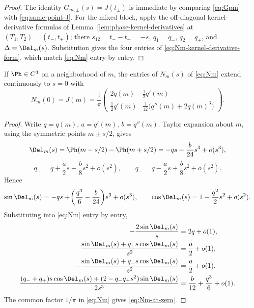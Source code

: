 \begin{proof}
The identity \(G_{m,\pm}(s) = J(t_\pm)\) is immediate by comparing
\eqref{eq:Gpm} with \eqref{eq:same-point-J}.  For the mixed block,
apply the off-diagonal kernel-derivative formulas of
Lemma~\ref{lem:phase-kernel-derivatives} at
\((T_1, T_2) = (t_-, t_+)\); there \(s_{12} = t_- - t_+ = -s\),
\(q_1 = q_-\), \(q_2 = q_+\), and \(\Delta = \Del_m(s)\).
Substitution gives the four entries of
\eqref{eq:Nm-kernel-derivative-form}, which match \eqref{eq:Nm} entry
by entry.
\end{proof}

\begin{lemma}
\label{lem:Nm-removable-singularity}
If \(\Ph\in C^3\) on a neighborhood of \(m\), the entries of
\(N_m(s)\) of \eqref{eq:Nm} extend continuously to \(s=0\) with
\begin{equation}
\label{eq:Nm-at-zero}
        N_m(0) = J(m)
        = \frac1\pi
        \begin{pmatrix}
        2q(m) & \tfrac12 q'(m)\\[0.8ex]
        \tfrac12 q'(m) & \tfrac1{12}\bigl(q''(m)+2q(m)^3\bigr)
        \end{pmatrix}.
\end{equation}
\end{lemma}

\begin{proof}
Write \(q = q(m)\), \(a = q'(m)\), \(b = q''(m)\).  Taylor expansion
about \(m\), using the symmetric points \(m\pm s/2\), gives
\[
        \Del_m(s)
        = \Ph(m-s/2)-\Ph(m+s/2)
        = -qs - \frac{b}{24}s^3 + o(s^3),
\]
\[
        q_+ = q + \frac{a}{2}s + \frac{b}{8}s^2 + o(s^2),
        \qquad
        q_- = q - \frac{a}{2}s + \frac{b}{8}s^2 + o(s^2).
\]
Hence
\[
        \sin\Del_m(s)
        = -qs + \!\left(\frac{q^3}{6}-\frac{b}{24}\right)\!s^3
          + o(s^3),
        \qquad
        \cos\Del_m(s) = 1 - \frac{q^2}{2}s^2 + o(s^2).
\]
Substituting into \eqref{eq:Nm} entry by entry,
\begin{align*}
        -\frac{2\sin\Del_m(s)}{s}
        &= 2q + o(1),\\
        \frac{\sin\Del_m(s)+q_+ s\cos\Del_m(s)}{s^2}
        &= \frac{a}{2} + o(1),\\
        -\frac{\sin\Del_m(s)+q_- s\cos\Del_m(s)}{s^2}
        &= \frac{a}{2} + o(1),\\
        \frac{(q_-+q_+)s\cos\Del_m(s)+(2-q_- q_+ s^2)\sin\Del_m(s)}{2s^3}
        &= \frac{b}{12}+\frac{q^3}{6}+o(1).
\end{align*}
The common factor \(1/\pi\) in \eqref{eq:Nm} gives
\eqref{eq:Nm-at-zero}.
\end{proof}

